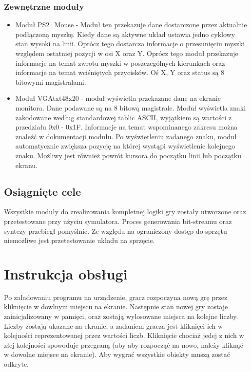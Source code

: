 \documentclass[polish,polish,a4paper]{article}
\begin{document}
\subsubsection{Zewnętrzne moduły}
\begin{itemize}
 \item
  Moduł PS2\_Mouse - Moduł ten przekazuje dane dostarczone przez aktualnie podłączoną myszkę.
  Kiedy dane są aktywne układ ustawia jedno cyklowy stan wysoki na linii.
  Oprócz tego dostarcza informacje o przesunięciu myszki względem ostatniej pozycji w osi X oraz Y.
  Oprócz tego moduł przekazuje informacje na temat zwrotu myszki w poszczególnych kierunkach oraz informacje na temat wciśniętych przycisków.
  Oś X, Y oraz status są 8 bitowymi magistralami.

 \item
  Moduł VGAtxt48x20 - moduł wyświetla przekazane dane na ekranie monitora.
  Dane podawane są na 8 bitową magistrale.
  Moduł wyświetla znaki zakodowane według standardowej tablic ASCII, wyjątkiem są wartości z przedziału 0x0 - 0x1F.
  Informacje na temat wspominanego zakresu można znaleźć w dokumentacji modułu.
  Po wyświetleniu zadanego znaku, moduł automatycznie zwiększa pozycję na której wystąpi wyświetlenie kolejnego znaku.
  Możliwy jest również powrót kursora do początku linii lub początku ekranu.

\end{itemize}

\subsection{Osiągnięte cele}
Wszystkie moduły do zrealizowania kompletnej logiki gry zostały utworzone oraz przetestowane przy użyciu symulatora.
Proces generowania bit-streamu oraz syntezy przebiegł pomyślnie.
Ze względu na ograniczony dostęp do sprzętu niemożliwe jest przetestowanie układu na sprzęcie.

\section{Instrukcja obsługi}
Po załadowaniu programu na urządzenie, gracz rozpoczyna nową grę przez kliknięcie w dowlnym miejscu na ekranie.
Następnie stan nowej gry zostaje zainicjalizowany w pamięci, oraz zostają wylosowane miejsca na kolejne liczby.
Liczby zostają ukazane na ekranie, a zadaniem gracza jest kliknięci ich w kolejności reprezentowanej przez wartości liczb.
Kliknięcie chociaż jedej z nich w złej kolejności spowoduje przegraną (aby aby rozpocząć na nowo, należy kliknąć w dowolne miejsce na ekranie).
Aby wygrać wszystkie obiekty muszą zostać odkryte.
\end{document}

